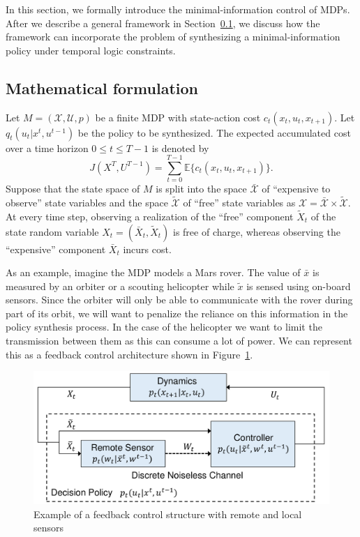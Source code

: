 In this section, we formally introduce the minimal-information control of MDPs.
After we describe a general framework in Section~\ref{secformulation}, we discuss how the framework can incorporate the problem of synthesizing a minimal-information policy under temporal logic constraints.

\subsection{Mathematical formulation}
\label{secformulation}

Let $M=(\mathcal{X}, \mathcal{U}, p)$ be a finite MDP with state-action cost $c_t(x_t, u_t, x_{t+1})$. Let $q_t(u_t|x^t,u^{t-1})$ be the policy to be synthesized. The expected accumulated cost over a time horizon $0\leq t \leq T-1$ is denoted by
\[
J(X^T, U^{T-1})=\sum_{t=0}^{T-1}\mathbb{E}\{c_t(x_t, u_t, x_{t+1})\}.
\]
Suppose that the state space of $M$ is split into the space $\bar{\mathcal{X}}$ of ``expensive to observe'' state variables and the space $\tilde{\mathcal{X}}$ of ``free'' state variables as $\mathcal{X}=\bar{\mathcal{X}}\times \tilde{\mathcal{X}}$.
At every time step, observing a realization of the ``free'' component $\tilde{X}_t$ of the state random variable $X_t=(\bar{X}_t, \tilde{X}_t)$ is free of charge, whereas observing the ``expensive'' component $\bar{X}_t$ incurs cost. 

As an example, imagine the MDP models a Mars rover. The value of $\bar{x}$ is measured by an orbiter or a scouting helicopter while $\tilde{x}$ is sensed using on-board sensors. Since the orbiter will only be able to communicate with the rover during part of its orbit, we will want to penalize the reliance on this information in the policy synthesis process. In the case of the helicopter we want to limit the transmission between them as this can consume a lot of power. We can represent this as a feedback control architecture shown in Figure~\ref{fig:NCS}. 
\begin{figure}
\centering
\includegraphics[width=\columnwidth]{comm.pdf}
\caption{Example of a feedback control structure with remote and local sensors}
\label{fig:NCS}
\end{figure}


